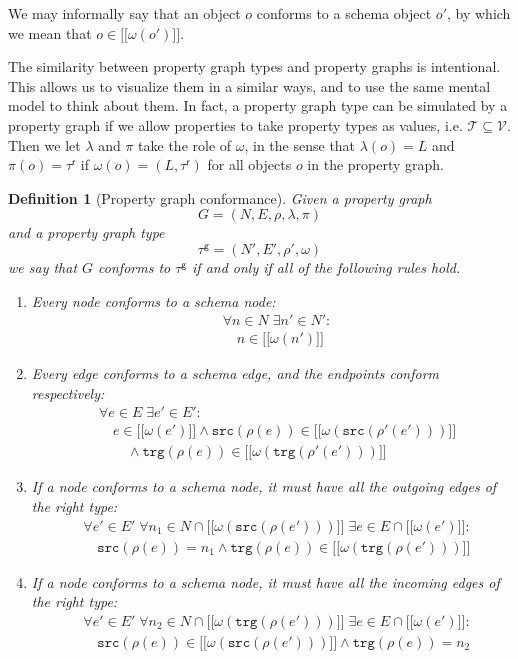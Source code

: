 \documentclass[a4paper]{article}
\newtheorem{definition}[theorem]{Definition}
\newcommand{\src}{\mathtt{src}}
\newcommand{\trg}{\mathtt{trg}}
\newcommand{\ptypes}{\mathcal{T}}
\newcommand{\rtype}{\tau^\mathsf{r}}
\newcommand{\gtype}{\tau^\mathsf{g}}
\newcommand{\lsem}{\ensuremath{[\![}}
\newcommand{\rsem}{\ensuremath{]\!]}}
\newcommand{\sem}[1]{\ensuremath{\lsem #1 \rsem}}
\begin{document}
We may informally say that an object $o$ conforms to a schema object $o'$, by which we mean that $o \in \sem{\omega(o')}$.

The similarity between property graph types and property graphs is intentional. This allows us to visualize them in a similar ways, and to use the same mental model to think about them. In fact, a property graph type can be simulated by a property graph if we allow properties to take property types as values, i.e. $\ptypes \subseteq \mathcal{V}$. Then we let $\lambda$ and $\pi$ take the role of $\omega$, in the sense that $\lambda(o) = L$ and $\pi(o) = \rtype$ if $\omega(o) = (L, \rtype)$ for all objects $o$ in the property graph.

\begin{definition}[Property graph conformance]
  Given a property graph $$G = (N, E, \rho, \lambda, \pi)$$ and a property graph type $$\gtype = (N', E', \rho', \omega)$$ we say that $G$ \emph{conforms} to $\gtype$ if and only if all of the following rules hold.

  \begin{enumerate}
    \item Every node conforms to a schema node:
    \begin{align*}
      &\forall n \in N \; \exists n' \in N' :\\
      &\quad n \in \sem{\omega(n')}
    \end{align*}
    
    \item Every edge conforms to a schema edge, and the endpoints conform respectively:
    \begin{align*}
      &\forall e \in E \; \exists e' \in E' :\\
      &\quad e \in \sem{\omega(e')} \wedge \src(\rho(e)) \in \sem{\omega(\src(\rho'(e')))}\\
      &\quad\quad\wedge \trg(\rho(e)) \in \sem{\omega(\trg(\rho'(e')))}
    \end{align*}
    
    \item If a node conforms to a schema node, it must have all the outgoing edges of the right type:
    \begin{align*}
      &\forall e' \in E' \; \forall n_1 \in N \cap \sem{\omega(\src(\rho(e')))} \; \exists e \in E \cap \sem{\omega(e')} :\\
      &\quad \src(\rho(e)) = n_1 \wedge \trg(\rho(e)) \in \sem{\omega(\trg(\rho(e')))}
    \end{align*}

    \item If a node conforms to a schema node, it must have all the incoming edges of the right type:
    \begin{align*}
      &\forall e' \in E' \; \forall n_2 \in N \cap \sem{\omega(\trg(\rho(e')))} \; \exists e \in E \cap \sem{\omega(e')} :\\
      &\quad \src(\rho(e)) \in \sem{\omega(\src(\rho(e')))} \wedge \trg(\rho(e)) = n_2
    \end{align*}
  \end{enumerate}
\end{definition}
\end{document}
